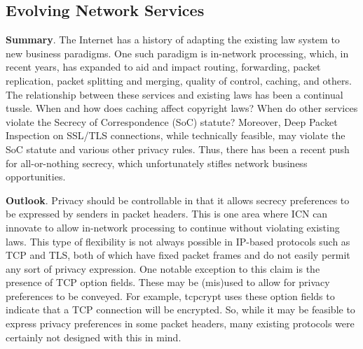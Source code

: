 \subsection{Evolving Network Services}
{\bf Summary}. The Internet has a history of adapting the existing law system to new business paradigms.
One such paradigm is in-network processing, which, in recent years, has expanded to
aid and impact routing, forwarding, packet replication, packet splitting and merging,
quality of control, caching, and others. The relationship between these services and
existing laws has been a continual tussle. When and how does caching affect copyright laws?
When do other services violate the Secrecy of Correspondence (SoC) statute?
Moreover, Deep Packet Inspection on SSL/TLS connections, while technically feasible, may violate
the SoC statute and various other privacy rules. Thus, there has been a recent push for
all-or-nothing secrecy, which unfortunately stifles network business opportunities.

{\bf Outlook}. Privacy should be controllable in that it allows secrecy preferences to be
expressed by senders in packet headers. This is one area where ICN can innovate to
allow in-network processing to continue without violating existing laws. This type
of flexibility is not always possible in IP-based protocols such as TCP and TLS, both
of which have fixed packet frames and do not easily permit any sort of privacy expression.
One notable exception to this claim is the presence of TCP option fields. These may
be (mis)used to allow for privacy preferences to be conveyed. For example, tcpcrypt \cite{bittau2010case}
uses these option fields to indicate that a TCP connection will be encrypted. So, while it may be feasible
to express privacy preferences in some packet headers, many existing protocols were 
certainly not designed with this in mind.

